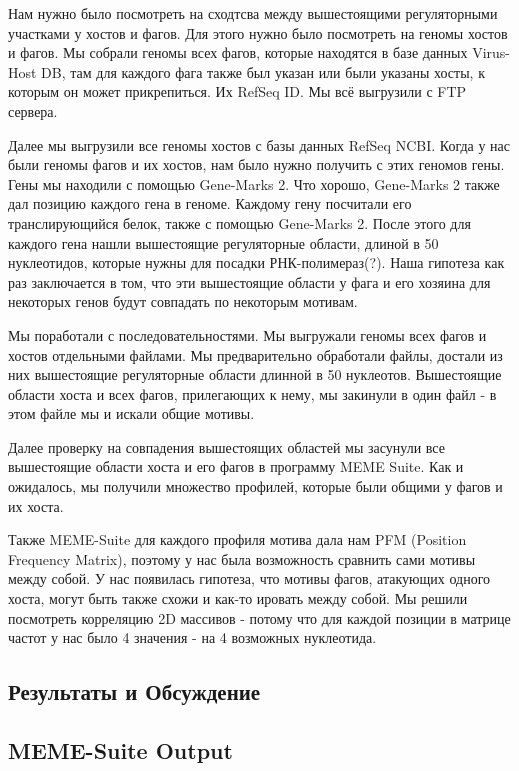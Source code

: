 \documentclass[a4paper,12pt]{article}
\begin{document}
\par{Нам нужно было посмотреть на сходтсва между вышестоящими регуляторными участками у хостов и фагов. Для этого нужно
было посмотреть на геномы хостов и фагов. Мы собрали геномы всех фагов, которые находятся в базе данных Virus-Host DB,
там для каждого фага также был указан или были указаны хосты, к которым он может прикрепиться. Их RefSeq ID. Мы всё
выгрузили с FTP сервера.}

\par{Далее мы выгрузили все геномы хостов с базы данных RefSeq NCBI. Когда у нас были геномы фагов и их хостов, нам было
нужно получить с этих геномов гены. Гены мы находили с помощью Gene-Marks 2. Что хорошо, Gene-Marks 2 также дал позицию
каждого гена в геноме. Каждому гену посчитали его транслирующийся белок, также с помощью Gene-Marks 2. После этого для
каждого гена нашли вышестоящие регуляторные области, длиной в 50 нуклеотидов, которые нужны для посадки РНК-полимераз(?).
Наша гипотеза как раз заключается в том, что эти вышестоящие области у фага и его хозяина для некоторых генов будут
совпадать по некоторым мотивам.}

\par{Мы поработали с последовательностями. Мы выгружали геномы всех фагов и хостов отдельными файлами. Мы предварительно
обработали файлы, достали из них вышестоящие регуляторные области длинной в 50 нуклеотов. Вышестоящие области хоста и
всех фагов, прилегающих к нему, мы закинули в один файл - в этом файле мы и искали общие мотивы.}

\par{Далее проверку на совпадения вышестоящих областей мы засунули все вышестоящие области хоста и его фагов в программу
MEME Suite. Как и ожидалось, мы получили множество профилей, которые были общими у фагов и их хоста. }

\par{Также MEME-Suite для каждого профиля мотива дала нам PFM (Position Frequency Matrix), поэтому у нас была возможность
сравнить сами мотивы между собой. У нас появилась гипотеза, что мотивы фагов, атакующих одного хоста, могут быть также
схожи и как-то ировать между собой. Мы решили посмотреть корреляцию 2D массивов - потому что для каждой позиции в
матрице частот у нас было 4 значения - на 4 возможных нуклеотида.}

\newpage
\begin{center}
    \item \section{Результаты и Обсуждение}
    \item \subsection{MEME-Suite Output}
\end{center}
\end{document}
